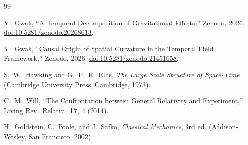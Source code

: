 \documentclass[12pt]{article}
\begin{document}
\begin{thebibliography}{99}

Y.~Gwak, ``A Temporal Decomposition of Gravitational Effects,'' Zenodo, 2026.
\href{https://doi.org/10.5281/zenodo.20268613}{doi:10.5281/zenodo.20268613}.

Y.~Gwak, ``Causal Origin of Spatial Curvature in the Temporal Field Framework,'' Zenodo, 2026.
\href{https://doi.org/10.5281/zenodo.21451658}{doi:10.5281/zenodo.21451658}.

S.~W.~Hawking and G.~F.~R.~Ellis, \textit{The Large Scale Structure of Space-Time} (Cambridge University Press, Cambridge, 1973).

C.~M.~Will, ``The Confrontation between General Relativity and Experiment,''
Living Rev.~Relativ.~\textbf{17}, 4 (2014).

H.~Goldstein, C.~Poole, and J.~Safko, \emph{Classical Mechanics}, 3rd ed.
(Addison-Wesley, San Francisco, 2002).

\end{thebibliography}
\end{document}
